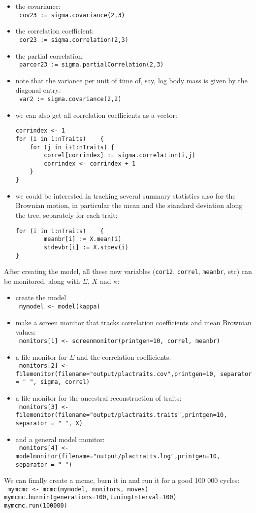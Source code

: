 \documentclass[usletter]{article}
\newcommand{\cmd}[1]{\texttt{#1}}
\begin{document}
\begin{itemize}
\item
the covariance:
\\
\cmd{
cov23 := sigma.covariance(2,3)
}
\item
the correlation coefficient:
\\
\cmd{
cor23 := sigma.correlation(2,3)
}
\item
the partial correlation:
\\
\cmd{
parcor23 := sigma.partialCorrelation(2,3)
}
\item
note that the variance per unit of time of, say, log body mass is given by the diagonal entry:
\\
\cmd{
var2 := sigma.covariance(2,2)
}
\item
we can also get all correlation coefficients as a vector:
\begin{verbatim}
corrindex <- 1
for (i in 1:nTraits)    {
    for (j in i+1:nTraits) {
        correl[corrindex] := sigma.correlation(i,j)
        corrindex <- corrindex + 1
    }
}
\end{verbatim}
\item
we could be interested in tracking several summary statistics also for the Brownian motion, in particular the mean and the standard deviation along the tree, separately for each trait:
\begin{verbatim}
for (i in 1:nTraits)    {
        meanbr[i] := X.mean(i)
        stdevbr[i] := X.stdev(i)
}
\end{verbatim}
\end{itemize}
After creating the model, all these new variables (\cmd{cor12}, \cmd{correl}, \cmd{meanbr}, etc) can be monitored, along with $\Sigma$, $X$ and $\kappa$:
\begin{itemize}
\item
create the model
\\
\cmd{
mymodel <- model(kappa)
}
\item
make a screen monitor that tracks correlation coefficients and mean Brownian values:
\\
\cmd{
monitors[1] <- screenmonitor(printgen=10, correl, meanbr)
}
\item
a file monitor for $\Sigma$ and the correlation coefficients:
\\
\cmd{
monitors[2] <- filemonitor(filename="output/plactraits.cov",printgen=10, separator = "  ", sigma, correl)
}
\item
a file monitor for the ancestral reconstruction of traits:
\\
\cmd{
monitors[3] <- filemonitor(filename="output/plactraits.traits",printgen=10, separator = "       ", X)
}
\item
and a general model monitor:
\\
\cmd{
monitors[4] <- modelmonitor(filename="output/plactraits.log",printgen=10, separator = " ")
}
\end{itemize}
We can finally create a mcmc, burn it in and run it for a good 100 000 cycles:
\\
\cmd{
mymcmc <- mcmc(mymodel, monitors, moves)
\\
mymcmc.burnin(generations=100,tuningInterval=100)
\\
mymcmc.run(100000)
}
\end{document}

